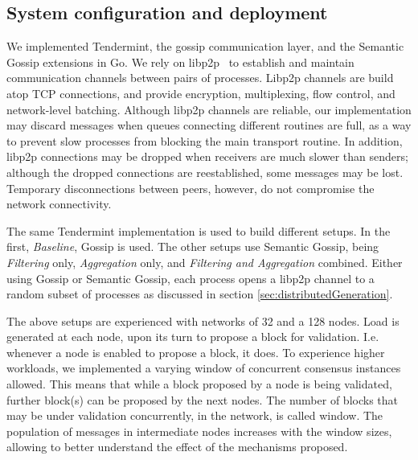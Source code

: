 


\subsection{System configuration and deployment}
\label{sec:setup}

We implemented Tendermint, the gossip communication layer, and the Semantic Gossip extensions in Go.
We rely on libp2p~\cite{libp2p} to establish and maintain communication
channels between pairs of processes.
Libp2p channels are build atop TCP connections, and provide encryption,
multiplexing, flow control, and network-level batching.
Although libp2p channels are reliable, our implementation may discard messages when queues connecting different routines are full, as a way to prevent slow
processes from blocking the main transport routine.
In addition, libp2p connections may be dropped when receivers are much slower
than senders; although the dropped connections are reestablished, some messages may be lost. Temporary disconnections between peers, however, do not compromise the network connectivity.

The same Tendermint implementation is used to build different setups. In the first, \emph{Baseline}, Gossip is used. The other setups use Semantic Gossip, being \emph{Filtering} only, \emph{Aggregation} only, and 
\emph{Filtering and Aggregation} combined.
Either using Gossip or Semantic Gossip, each process opens a libp2p channel to a random subset of processes as discussed in section \ref{sec:distributedGeneration}.

The above setups are experienced with networks of 32 and a 128 nodes.
%
Load is generated at each node, upon its turn to propose a 
block for validation. I.e. whenever a node is enabled to propose a block, it does.
%
To experience higher workloads, we implemented a varying window of concurrent consensus instances allowed.
This means that while a block proposed by a node is being validated, further 
block(s) can be proposed by the next nodes.
The number of blocks that may be under validation concurrently, in the network, 
is called window.   The population of messages in intermediate nodes increases with the window sizes, allowing to better understand the effect of the mechanisms proposed.

